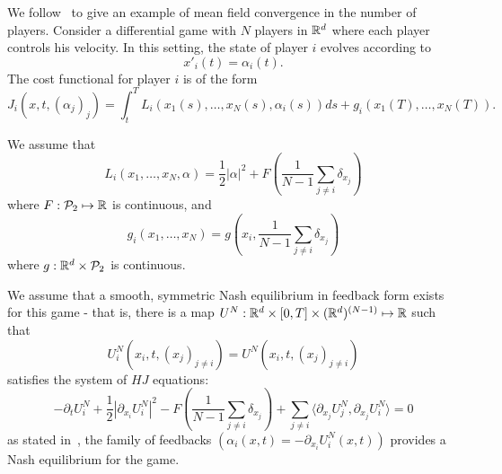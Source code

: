 

We follow~\cite{cardaliaguet2010notes} to give an example of mean field convergence in the number of players.
Consider a differential game with $N$ players in $\mathbb{R}^d$ where each player
controls his velocity. In this setting, the state of player $i$
 evolves according to
\begin{equation}
    x'_i(t) = \alpha_i(t).
\end{equation}
The cost functional for player $i$ is of the form
\begin{equation}
    J_i(x, t, (\alpha_j)_j) = \int_t^T L_i (x_1(s), \dots, x_N(s), \alpha_i(s)) ds + g_i(x_1(T), \dots, x_N(T)).
\end{equation}

We assume that
\begin{equation}
    L_i(x_1, \dots, x_N, \alpha) = \frac{1}{2}|\alpha|^2 + F\left( \frac{1}{N-1} \sum_{j \neq i} \delta_{x_j}  \right)
\end{equation}
where $F : \mathcal{P}_2 \mapsto \mathbb{R}$ is continuous, and
\begin{equation}
    g_i(x_1, \dots, x_N) = g(x_i, \frac{1}{N-1} \sum_{j\neq i} \delta_{x_j})
\end{equation}
where $g: \mathbb{R}^d \times \mathcal{P}_2$ is continuous.

We assume that a smooth, symmetric Nash equilibrium in feedback form exists for
this game - that is, there is a map
$U^N : \mathbb{R}^d \times [0,T] \times (\mathbb{R}^d)^{(N-1)} \mapsto \mathbb{R}$ such that
\begin{equation}
    U^N_i(x_i, t, (x_j)_{j\neq i}) = U^N(x_i, t, (x_j)_{j\neq i})
\end{equation}
satisfies the system of $HJ$ equations:
\begin{equation}
    -\partial_t U_i^N + \frac{1}{2}|\partial_{x_i} U_i^N|^2 - F\left( \frac{1}{N-1}  \sum_{j\neq i} \delta_{x_j} \right) + \sum_{j \neq i} \langle \partial_{x_j} U^N_j, \partial_{x_j} U^N_i \rangle = 0
\end{equation}
as stated in~\cite{cardaliaguet2010notes}, the family of feedbacks $(\alpha_i(x,t) = - \partial_{x_i} U^N_i (x,t))$
provides a Nash equilibrium for the game.


